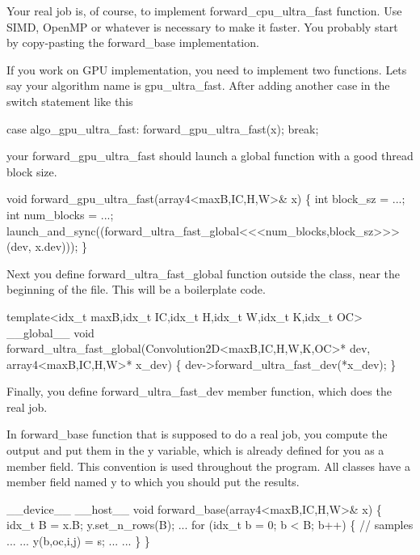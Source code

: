 Your real job is, of course, to implement forward\+\_\+cpu\+\_\+ultra\+\_\+fast function. Use S\+I\+MD, Open\+MP or whatever is necessary to make it faster. You probably start by copy-\/pasting the forward\+\_\+base implementation.

If you work on G\+PU implementation, you need to implement two functions. Let\textquotesingle{}s say your algorithm name is gpu\+\_\+ultra\+\_\+fast. After adding another case in the switch statement like this


\begin{DoxyCode}
case algo\_gpu\_ultra\_fast:
  forward\_gpu\_ultra\_fast(x); break;
\end{DoxyCode}


your forward\+\_\+gpu\+\_\+ultra\+\_\+fast should launch a global function with a good thread block size.


\begin{DoxyCode}
void forward\_gpu\_ultra\_fast(array4<maxB,IC,H,W>& x) \{
  int block\_sz = ...;
  int num\_blocks = ...;
  launch\_and\_sync((forward\_ultra\_fast\_global<<<num\_blocks,block\_sz>>>(dev, x.dev)));
\}
\end{DoxyCode}


Next you define forward\+\_\+ultra\+\_\+fast\+\_\+global function outside the class, near the beginning of the file. This will be a boilerplate code.


\begin{DoxyCode}
template<idx\_t maxB,idx\_t IC,idx\_t H,idx\_t W,idx\_t K,idx\_t OC>
\_\_global\_\_ void forward\_ultra\_fast\_global(Convolution2D<maxB,IC,H,W,K,OC>* dev,
                                          array4<maxB,IC,H,W>* x\_dev) \{
  dev->forward\_ultra\_fast\_dev(*x\_dev);
\}
\end{DoxyCode}


Finally, you define forward\+\_\+ultra\+\_\+fast\+\_\+dev member function, which does the real job.

In forward\+\_\+base function that is supposed to do a real job, you compute the output and put them in the \textquotesingle{}y\textquotesingle{} variable, which is already defined for you as a member field. This convention is used throughout the program. All classes have a member field named \textquotesingle{}y\textquotesingle{} to which you should put the results.


\begin{DoxyCode}
\_\_device\_\_ \_\_host\_\_ 
void forward\_base(array4<maxB,IC,H,W>& x) \{
  idx\_t B = x.B;
  y.set\_n\_rows(B);
  ...
  for (idx\_t b = 0; b < B; b++) \{       // samples
    ...
       ...
          y(b,oc,i,j) = s;
       ...
    ...
  \}
\}
\end{DoxyCode}


